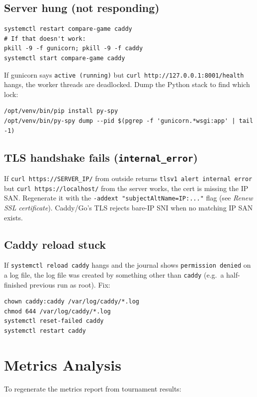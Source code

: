 \documentclass[11pt]{article}
\begin{document}
\subsection{Server hung (not responding)}
\begin{lstlisting}
systemctl restart compare-game caddy
# If that doesn't work:
pkill -9 -f gunicorn; pkill -9 -f caddy
systemctl start compare-game caddy
\end{lstlisting}

If gunicorn says \texttt{active (running)} but \texttt{curl http://127.0.0.1:8001/health} hangs, the worker threads are deadlocked. Dump the Python stack to find which lock:
\begin{lstlisting}
/opt/venv/bin/pip install py-spy
/opt/venv/bin/py-spy dump --pid $(pgrep -f 'gunicorn.*wsgi:app' | tail -1)
\end{lstlisting}

\subsection{TLS handshake fails (\texttt{internal\_error})}

If \texttt{curl https://SERVER\_IP/} from outside returns \texttt{tlsv1 alert internal error} but \texttt{curl https://localhost/} from the server works, the cert is missing the IP SAN. Regenerate it with the \texttt{-addext "subjectAltName=IP:..."} flag (see \emph{Renew SSL certificate}). Caddy/Go's TLS rejects bare-IP SNI when no matching IP SAN exists.

\subsection{Caddy reload stuck}

If \texttt{systemctl reload caddy} hangs and the journal shows \texttt{permission denied} on a log file, the log file was created by something other than \texttt{caddy} (e.g.\ a half-finished previous run as root). Fix:
\begin{lstlisting}
chown caddy:caddy /var/log/caddy/*.log
chmod 644 /var/log/caddy/*.log
systemctl reset-failed caddy
systemctl restart caddy
\end{lstlisting}

\section{Metrics Analysis}

To regenerate the metrics report from tournament results:
\end{document}
